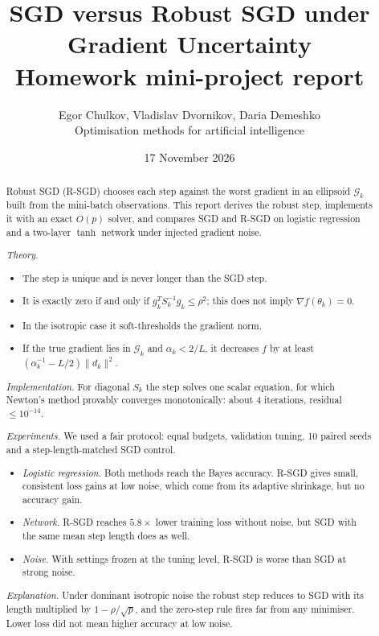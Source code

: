 \documentclass[11pt,a4paper]{article}
\title{SGD versus Robust SGD under Gradient Uncertainty\\[0.3em]
\large Homework mini-project report}
\author{Egor Chulkov, Vladislav Dvornikov, Daria Demeshko\\[0.2em]\small Optimisation methods for artificial intelligence}
\date{17 November 2026}
\newcommand{\G}{\mathcal{G}_k}
\begin{document}
\maketitle

\begin{abstract}
\noindent Robust SGD (R-SGD) chooses each step against the worst gradient in an ellipsoid
$\G$ built from the mini-batch observations. This report derives the robust step, implements it
with an exact $O(p)$ solver, and compares SGD and R-SGD on logistic regression and a two-layer
$\tanh$ network under injected gradient noise.

\emph{Theory.}
\begin{itemize}
\item The step is unique and is never longer than the SGD step.
\item It is exactly zero if and only if $g_k^TS_k^{-1}g_k\le\rho^2$; this does not imply
$\nabla f(\theta_k)=0$.
\item In the isotropic case it soft-thresholds the gradient norm.
\item If the true gradient lies in $\G$ and $\alpha_k<2/L$, it decreases $f$ by at least
$(\alpha_k^{-1}-L/2)\|d_k\|^2$.
\end{itemize}

\emph{Implementation.} For diagonal $S_k$ the step solves one scalar equation, for which Newton's
method provably converges monotonically: about 4 iterations, residual $\le10^{-14}$.

\emph{Experiments.} We used a fair protocol: equal budgets, validation tuning, 10 paired seeds and
a step-length-matched SGD control.
\begin{itemize}
\item \emph{Logistic regression.} Both methods reach the Bayes accuracy. R-SGD gives small,
consistent loss gains at low noise, which come from its adaptive shrinkage, but no accuracy gain.
\item \emph{Network.} R-SGD reaches $5.8\times$ lower training loss without noise, but SGD with the
same mean step length does as well.
\item \emph{Noise.} With settings frozen at the tuning level, R-SGD is worse than SGD at strong
noise.
\end{itemize}

\emph{Explanation.} Under dominant isotropic noise the robust step reduces to SGD with its length
multiplied by $1-\rho/\sqrt p$, and the zero-step rule fires far from any minimiser. Lower loss did
not mean higher accuracy at low noise.
\end{abstract}
\end{document}
